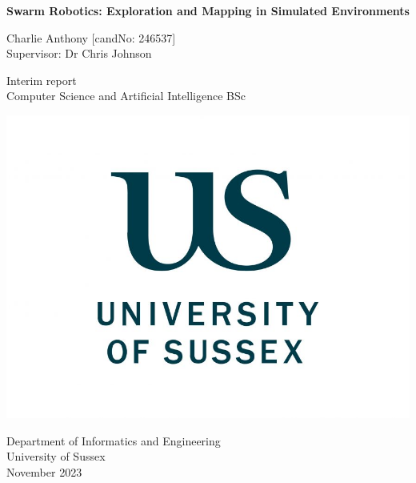 \documentclass[12pt]{article}
\begin{document}
\begin{titlepage}
    \centering
    \vspace*{5cm}

    \Large
    \textbf{Swarm Robotics: Exploration and Mapping in Simulated Environments}

    \vspace{1cm}

    Charlie Anthony [candNo: 246537]\\
    Supervisor: Dr Chris Johnson

    \vfill

    \vspace{1cm}

    \small
    Interim report\\
    Computer Science and Artificial Intelligence BSc

    \includegraphics[width=0.3\linewidth]{sussex_logo.jpg} %


    \small
    Department of Informatics and Engineering\\
    University of Sussex\\
    November 2023
\end{titlepage}

\tableofcontents
\newpage

\end{document}
